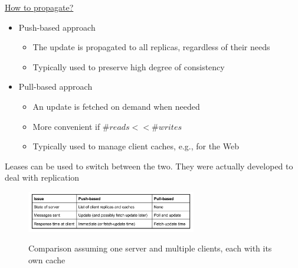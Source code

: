 \documentclass[10pt,a4paper]{article}
\begin{document}
\underline{How to propagate?}
\begin{itemize}
	\item Push-based approach
	\begin{itemize}
		\item The update is propagated to all replicas, regardless of their needs
		\item Typically used to preserve high degree of consistency
	\end{itemize}
	\item Pull-based approach
	\begin{itemize}
		\item An update is fetched on demand when needed
		\item More convenient if $\#reads << \#writes$
		\item Typically used to manage client caches, e.g., for the Web
	\end{itemize}
\end{itemize}
 Leases can be used to switch between the two. They were actually developed to deal with replication
 \begin{figure}[h!]
 \hfill \includegraphics[width=210pt]{images/update-propagation.png}\hspace*{\fill}
  \label{fig:updated-propagation}
  \caption{Comparison assuming one server and multiple clients, each with its own cache}
\end{figure}
\end{document}
